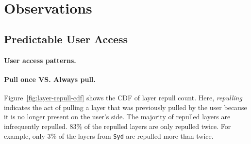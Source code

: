\section{Observations}
\label{sec:dataset-analysis}

%
%

%




\subsection{Predictable User Access}


\paragraph{User access patterns.} 

\paragraph{Pull once VS. Always pull.}
Figure~\ref{fig:layer-repull-cdf} shows the CDF of layer repull count. Here, \emph{repulling} indicates the act of pulling a layer that was previously pulled by the user because it is no longer present on the user's side.
The majority of repulled layers are infrequently repulled.
$83$\% of the repulled layers are only repulled twice.
For example, only $3$\% of the layers from \texttt{Syd} are repulled more than twice.

